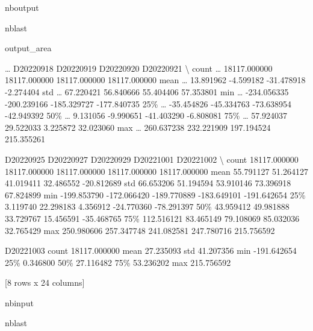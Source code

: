 \documentclass[letterpaper,10pt]{sphinxmanual}
\begin{document}
\begin{sphinxuseclass}{nboutput}
\begin{sphinxuseclass}{nblast}
{\begin{sphinxuseclass}{output_area}
\begin{sphinxuseclass}{}
\begin{sphinxVerbatim}[commandchars=\\\{\}]
       {\ldots}     D20220918     D20220919     D20220920     D20220921  \textbackslash{}
count  {\ldots}  18117.000000  18117.000000  18117.000000  18117.000000
mean   {\ldots}     13.891962     -4.599182    -31.478918     -2.274404
std    {\ldots}     67.220421     56.840666     55.404406     57.353801
min    {\ldots}   -234.056335   -200.239166   -185.329727   -177.840735
25\%    {\ldots}    -35.454826    -45.334763    -73.638954    -42.949392
50\%    {\ldots}      9.131056     -9.990651    -41.403290     -6.808081
75\%    {\ldots}     57.924037     29.522033      3.225872     32.023060
max    {\ldots}    260.637238    232.221909    197.194524    215.355261

          D20220925     D20220927     D20220929     D20221001     D20221002  \textbackslash{}
count  18117.000000  18117.000000  18117.000000  18117.000000  18117.000000
mean      55.791127     51.264127     41.019411     32.486552    -20.812689
std       66.653206     51.194594     53.910146     73.396918     67.824899
min     -199.853790   -172.066420   -189.770889   -183.649101   -191.642654
25\%        3.119740     22.298183      4.356912    -24.770360    -78.291397
50\%       43.959412     49.981888     33.729767     15.456591    -35.468765
75\%      112.516121     83.465149     79.108069     85.032036     32.765429
max      250.980606    257.347748    241.082581    247.780716    215.756592

          D20221003
count  18117.000000
mean      27.235093
std       41.207356
min     -191.642654
25\%        0.346800
50\%       27.116482
75\%       53.236202
max      215.756592

[8 rows x 24 columns]
\end{sphinxVerbatim}



\end{sphinxuseclass}
\end{sphinxuseclass}
}

\end{sphinxuseclass}
\end{sphinxuseclass}
\begin{sphinxuseclass}{nbinput}
\begin{sphinxuseclass}{nblast}
{
\begin{sphinxVerbatim}[commandchars=\\\{\}]
\llap{\color{nbsphinxin}[ ]:\,\hspace{\fboxrule}\hspace{\fboxsep}}
\end{sphinxVerbatim}
}

\end{sphinxuseclass}
\end{sphinxuseclass}
\end{document}
